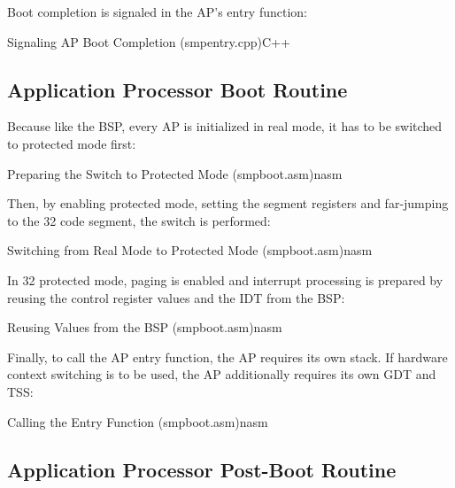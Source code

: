 Boot completion is signaled in the AP's entry function:

\begin{codeblock}{Signaling AP Boot Completion (smp\textunderscore{}entry.cpp)}{C++}
\end{codeblock}

\subsection{Application Processor Boot Routine}
\label{subsec:apxapboot}

Because like the BSP, every AP is initialized in real mode, it has to be switched to protected mode first:

\begin{codeblock}{Preparing the Switch to Protected Mode (smp\textunderscore{}boot.asm)}{nasm}
\end{codeblock}

Then, by enabling protected mode, setting the segment registers and far-jumping to the \SI{32}{\bit} code segment, the switch is performed:

\begin{codeblock}{Switching from Real Mode to Protected Mode (smp\textunderscore{}boot.asm)}{nasm}
\end{codeblock}

In \SI{32}{\bit} protected mode, paging is enabled and interrupt processing is prepared by reusing the control register values and the IDT from the BSP\@:

\begin{codeblock}{Reusing Values from the BSP (smp\textunderscore{}boot.asm)}{nasm}
\end{codeblock}

Finally, to call the AP entry function, the AP requires its own stack. If hardware context switching is to be used, the AP additionally requires its own GDT and TSS\@:

\begin{codeblock}{Calling the Entry Function (smp\textunderscore{}boot.asm)}{nasm}
\end{codeblock}

\subsection{Application Processor Post-Boot Routine}
\label{subsec:apxappostboot}

